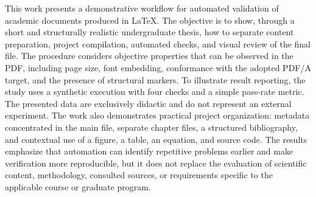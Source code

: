 This work presents a demonstrative workflow for automated validation of academic documents produced in LaTeX. The objective is to show, through a short and structurally realistic undergraduate thesis, how to separate content preparation, project compilation, automated checks, and visual review of the final file. The procedure considers objective properties that can be observed in the PDF, including page size, font embedding, conformance with the adopted PDF/A target, and the presence of structural markers. To illustrate result reporting, the study uses a synthetic execution with four checks and a simple pass-rate metric. The presented data are exclusively didactic and do not represent an external experiment. The work also demonstrates practical project organization: metadata concentrated in the main file, separate chapter files, a structured bibliography, and contextual use of a figure, a table, an equation, and source code. The results emphasize that automation can identify repetitive problems earlier and make verification more reproducible, but it does not replace the evaluation of scientific content, methodology, consulted sources, or requirements specific to the applicable course or graduate program.

